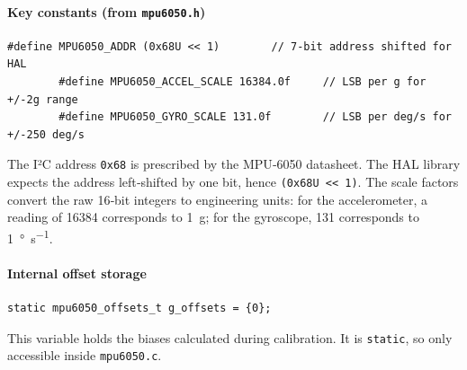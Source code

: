 \documentclass[12pt,a4paper]{article}
\newcommand{\file}[1]{\texttt{#1}}
\begin{document}
	\paragraph*{Key constants (from \file{mpu6050.h})}
	\begin{lstlisting}[caption=MPU‑6050 address and scale factors, label=lst:mpu_const]
		#define MPU6050_ADDR (0x68U << 1)        // 7-bit address shifted for HAL
		#define MPU6050_ACCEL_SCALE 16384.0f     // LSB per g for +/-2g range
		#define MPU6050_GYRO_SCALE 131.0f        // LSB per deg/s for +/-250 deg/s
	\end{lstlisting}
	The I²C address \texttt{0x68} is prescribed by the MPU‑6050 datasheet. The HAL library expects the address left‑shifted by one bit, hence \texttt{(0x68U << 1)}.  
	The scale factors convert the raw 16‑bit integers to engineering units: for the accelerometer, a reading of 16384 corresponds to \SI{1}{g}; for the gyroscope, 131 corresponds to \SI{1}{\degree\per\second}.
	
	\paragraph*{Internal offset storage}
	\begin{lstlisting}[caption=Global offset structure, label=lst:mpu_offsets]
		static mpu6050_offsets_t g_offsets = {0};
	\end{lstlisting}
	This variable holds the biases calculated during calibration. It is \texttt{static}, so only accessible inside \texttt{mpu6050.c}.
	
\end{document}

